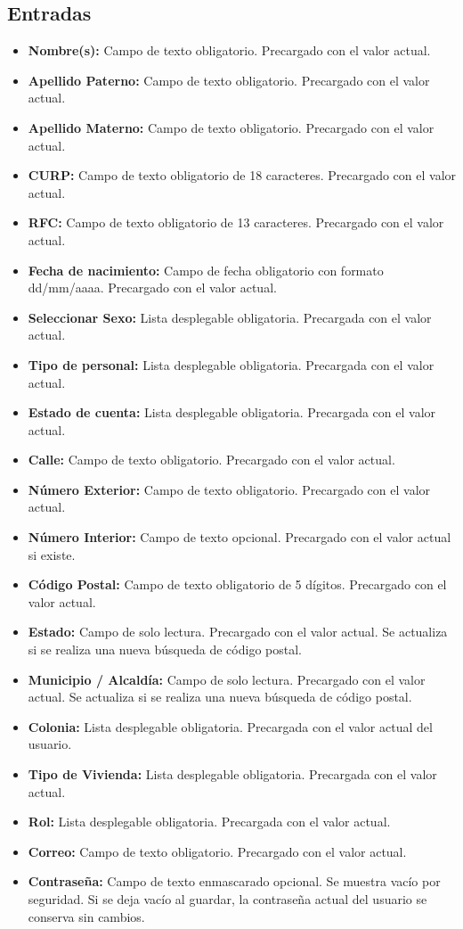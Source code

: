 \subsection{Entradas}
\begin{itemize}
	\item \textbf{Nombre(s):} Campo de texto obligatorio. 
	Precargado con el valor actual.
	\item \textbf{Apellido Paterno:} Campo de texto obligatorio. 
	Precargado con el valor actual.
	\item \textbf{Apellido Materno:} Campo de texto obligatorio. 
	Precargado con el valor actual.
	\item \textbf{CURP:} Campo de texto obligatorio de 18 caracteres. 
	Precargado con el valor actual.
	\item \textbf{RFC:} Campo de texto obligatorio de 13 caracteres. 
	Precargado con el valor actual.
	\item \textbf{Fecha de nacimiento:} Campo de fecha obligatorio 
	con formato dd/mm/aaaa. Precargado con el valor actual.
	\item \textbf{Seleccionar Sexo:} Lista desplegable obligatoria. 
	Precargada con el valor actual.
	\item \textbf{Tipo de personal:} Lista desplegable obligatoria. 
	Precargada con el valor actual.
	\item \textbf{Estado de cuenta:} Lista desplegable obligatoria. 
	Precargada con el valor actual.
	\item \textbf{Calle:} Campo de texto obligatorio. 
	Precargado con el valor actual.
	\item \textbf{Número Exterior:} Campo de texto obligatorio. 
	Precargado con el valor actual.
	\item \textbf{Número Interior:} Campo de texto opcional. 
	Precargado con el valor actual si existe.
	\item \textbf{Código Postal:} Campo de texto obligatorio de 
	5 dígitos. Precargado con el valor actual.
	\item \textbf{Estado:} Campo de solo lectura. Precargado con 
	el valor actual. Se actualiza si se realiza una nueva búsqueda 
	de código postal.
	\item \textbf{Municipio / Alcaldía:} Campo de solo lectura. 
	Precargado con el valor actual. Se actualiza si se realiza 
	una nueva búsqueda de código postal.
	\item \textbf{Colonia:} Lista desplegable obligatoria. 
	Precargada con el valor actual del usuario.
	\item \textbf{Tipo de Vivienda:} Lista desplegable obligatoria. 
	Precargada con el valor actual.
	\item \textbf{Rol:} Lista desplegable obligatoria. 
	Precargada con el valor actual.
	\item \textbf{Correo:} Campo de texto obligatorio. 
	Precargado con el valor actual.
	\item \textbf{Contraseña:} Campo de texto enmascarado opcional. 
	Se muestra vacío por seguridad. Si se deja vacío al guardar, 
	la contraseña actual del usuario se conserva sin cambios.
\end{itemize}

